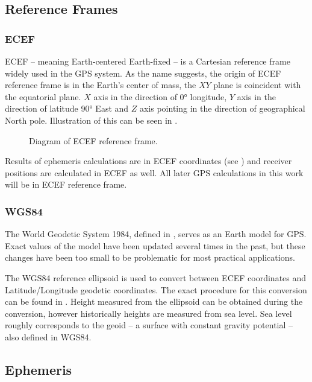 \subsection{Reference Frames}
\label{sec:ref-frames}

\subsubsection{ECEF}
ECEF -- meaning Earth-centered Earth-fixed -- is a Cartesian reference frame widely used in the GPS system.
As the name suggests, the origin of ECEF reference frame is in the Earth's center of mass, the \(XY\) plane is coincident
with the equatorial plane.
\(X\) axis in the direction of \ang{0} longitude, \(Y\) axis in the direction of latitude
\ang{90} East and \(Z\) axis pointing in
the direction of geographical North pole.
Illustration of this can be seen in .

\begin{figure}[h]
	\centering
	
	\caption{Diagram of ECEF reference frame.}
	\label{fig:ecef}
\end{figure}

Results of ephemeris calculations are in ECEF coordinates
(see ) and receiver positions are calculated
in ECEF as well.
All later GPS calculations in this work will be in ECEF reference frame.

\subsubsection{WGS84}
The World Geodetic System 1984, defined in \cite{nima04},
serves as an Earth model for GPS.
Exact values of the model have been updated several times in the past,
but these changes have been too small to be problematic for most practical
applications.

The WGS84 reference ellipsoid is used to convert between ECEF coordinates and
Latitude/Longitude geodetic coordinates.
The exact procedure for this conversion can be found in \cite{nima04}.
Height measured from the ellipsoid can be obtained during the conversion,
however historically heights are measured from sea level.
Sea level roughly corresponds to the geoid -- a surface with constant gravity
potential -- also defined in WGS84.



\subsection{Ephemeris}
\label{sec:gps-ephemeris}

